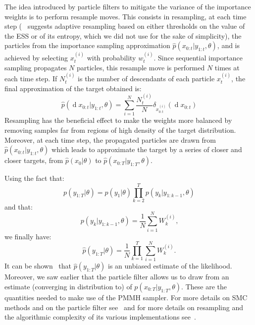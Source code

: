 \documentclass[12pt]{article}
\begin{document}
	The idea introduced by particle filters to mitigate the variance of the importance weights is to perform resample moves. This consists in resampling, at each time step (~\cite{doucet2009tutorial} suggests adaptive resampling based on either thresholds on the value of the ESS or of its entropy, which we did not use for the sake of simplicity), the particles from the importance sampling approximation $\hat{p}(x_{0:t}|y_{1:t}, \theta)$, and is achieved by selecting $x_t^{(i)}$ with probability $w_t^{(i)}$. Since sequential importance sampling propagates $N$ particles, this resample move is performed $N$ times at each time step. If $N_t^{(i)}$ is the number of descendants of each particle $x_t^{(i)}$, the final approximation of the target obtained is:
	\begin{equation*}
 	\hat{p}(\operatorname{d}x_{0:t}|y_{1:t}, \theta) = \sum_{i=1}^{N}\frac{N_t^{(i)}}{N} \delta_{x_{0:t}^{(i)}}(\operatorname{d}x_{0:t})
	\end{equation*}
	Resampling has the beneficial effect to make the weights more balanced by removing samples far from regions of high density of the target distribution. Moreover, at each time step, the propagated particles are drawn from $\hat{p}(x_{0:t}|y_{1:t}, \theta)$ which leads to approximate the target by a series of closer and closer targets, from $\hat{p}(x_0|\theta)$ to $\hat{p}(x_{0:T}|y_{1:T}, \theta)$. 
	 
	Using the fact that: 
	\begin{equation*}
	p(y_{1:T}| \theta) = p(y_1|\theta)\prod_{k=2}^{T}p(y_k|y_{1:k-1}, \theta)
	\end{equation*}
	and that:
	\begin{equation*}
	p(y_k|y_{1:k-1}, \theta) = \frac{1}{N}\sum_{i=1}^{N}W_k^{(i)}\text{,}
	\end{equation*}
	we finally have:
	\begin{equation*}
	\hat{p}(y_{1:T}| \theta)=\frac{1}{N}\prod_{k=1}^{T}\sum_{i=1}^{N}W_k^{(i)}\text{.}
	\end{equation*}
	It can be shown~\cite{del2004feynman} that $\hat{p}(y_{1:T}| \theta)$ is an unbiased estimate of the likelihood. Moreover, we saw earlier that the particle filter allows us to draw from an estimate (converging in distribution to) of $p(x_{0:T}|y_{1:T}, \theta)$. These are the quantities needed to make use of the PMMH sampler. For more details on SMC methods and on the particle filter see~\cite{doucet2009tutorial} and for more details on resampling and the algorithmic complexity of its various implementations see~\cite{murray2013parallel}.
	
\end{document}
